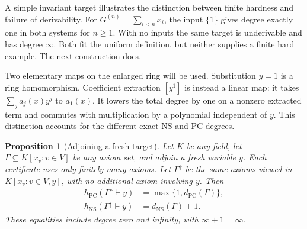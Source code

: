 \documentclass[11pt,a4paper]{article}
\newtheorem{proposition}[theorem]{Proposition}
\theoremstyle{definition}\newtheorem{definition}[theorem]{Definition}
\theoremstyle{remark}\newtheorem{remark}[theorem]{Remark}
\newcommand{\NS}{\mathrm{NS}}\newcommand{\PC}{\mathrm{PC}}
\begin{document}
A simple invariant target illustrates the distinction between finite
hardness and failure of derivability. For $G^{(n)}=\sum_{i<n}x_i$, the input
$\{1\}$ gives degree exactly one in both systems for $n\ge1$. With no
inputs the same target is underivable and has degree $\infty$. Both
fit the uniform definition, but neither supplies a finite hard example.
The next construction does.

Two elementary maps on the enlarged ring will be used. Substitution
$y=1$ is a ring homomorphism. Coefficient extraction $[y^1]$ is instead
a linear map: it takes $\sum_j a_j(x)y^j$ to $a_1(x)$.
It lowers the total degree by one on a nonzero extracted term and
commutes with multiplication by a polynomial independent of $y$.
This distinction accounts for the different exact NS and PC degrees.

\begin{proposition}[Adjoining a fresh target]\label{prop:fresh-target}
Let $K$ be any field, let $\Gamma\subseteq K[x_v:v\in V]$ be any axiom
set, and adjoin a fresh variable $y$. Each certificate uses only
finitely many axioms. Let $\Gamma^\uparrow$ be the same axioms viewed
in $K[x_v:v\in V,y]$, with no additional axiom involving $y$. Then
\begin{equation}\label{eq:fresh-identities}
 \begin{aligned}
 h_{\PC}(\Gamma^\uparrow\vdash y)
       &=\max\{1,d_{\PC}(\Gamma)\},\\
 h_{\NS}(\Gamma^\uparrow\vdash y)
       &=d_{\NS}(\Gamma)+1.
 \end{aligned}
\end{equation}
These equalities include degree zero and infinity, with
$\infty+1=\infty$.
\end{proposition}
\end{document}
